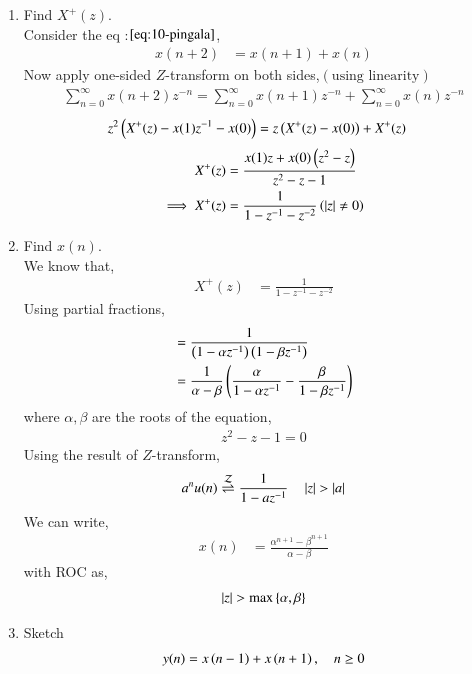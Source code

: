 \documentclass[journal,12pt,twocolumn]{IEEEtran}
\renewcommand\thesection{\arabic{section}}
\begin{document}
\begin{enumerate}[label=\thesection.\arabic*,ref=\thesection.\theenumi]
\item 	Find $X^{+}(z)$.\\
	\solution Consider the eq :$\eqref{eq:10-pingala}$,
	  \begin{align}
		x(n+2) &= x(n+1) + x(n)
	  \end{align}
	  Now apply one-sided $Z$-transform on both sides,$(\text{using linearity})$
         \begin{align}
		 \sum_{n=0}^{\infty}x(n+2)z^{-n} = \sum_{n=0}^{\infty}x(n+1)z^{-n} + \sum_{n=0}^{\infty}x(n)z^{-n} 
         \end{align}
	 \begin{align}
		 z^2\left(X^{+}(z) - x(1)z^{-1} - x(0)\right) &= z\left(X^{+}(z) - x(0)\right) + X^{+}(z)
	 \end{align}
	 \begin{align}
		 X^{+}(z) &= \frac{x(1)z + x(0)\left(z^2 - z\right)}{z^2 - z -1} \\
		 \implies X^{+}(z) &= \frac{1}{1-z^{-1}-z^{-2}} \label{eq:X_z} \left(\left\vert z\right\vert \neq 0\right)
	 \end{align}
	\item Find $x(n)$. \\
	 \solution We know that,
	  \begin{align}
            X^{+}(z) &= \frac{1}{1-z^{-1}-z^{-2}} 
          \end{align}
	  Using partial fractions,
	   \begin{align}
		   &= \frac{1}{\left(1-\alpha z^{-1}\right)\left(1-\beta z^{-1}\right)} \\
		   &= \frac{1}{\alpha - \beta}\left(\frac{\alpha}{1-\alpha z^{-1}} - \frac{\beta}{1-\beta z^{-1}}\right)
	   \end{align}
	     where $\alpha , \beta$ are the roots of the equation,
	      \begin{align}
		      z^2 - z -1 =0
	      \end{align}
          Using the result of $Z$-transform,
	  \begin{align}
	   a^nu(n) \overset{\mathcal{Z}}{ \rightleftharpoons} \frac{1}{1-az^{-1}} \quad \left\vert z\right\vert > \left\vert a\right\vert \\
          \end{align}
	      We can write, 
	      \begin{align}
		      x(n) &= \frac{\alpha^{n+1} - \beta^{n+1}}{\alpha -\beta}\label{eq:x_n} 
	      \end{align}
	      with ROC as,
	          \begin{align}
			  \left\vert z\right\vert > \text{max}\left\{\alpha,\beta\right\}
		  \end{align}
	\item Sketch 
\begin{align}
	y(n)	 = x\left(n-1\right) + x\left(n+1\right),  \quad n \ge 0
	\label{eq:10-orig-diff-rev}
\end{align}


\end{enumerate}
\end{document}
